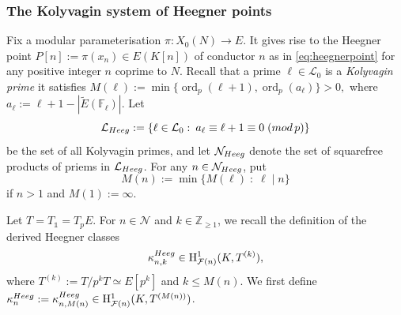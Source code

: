 \documentclass[10pt,reqno]{amsart}
\numberwithin{equation}{section}
\theoremstyle{plain}
\theoremstyle{definition}
\theoremstyle{definition}
\theoremstyle{plain}
\theoremstyle{plain}
\newtheorem{lemma}[thm]{Lemma}
\theoremstyle{plain}
\theoremstyle{plain}
\theoremstyle{plain}
\theoremstyle{plain}
\DeclareMathOperator{\ord}{ord}
\newcommand{\Z}{\mathbb{Z}}
\newcommand{\Fcal}{\mathcal{F}}
\newcommand{\cL}{\mathcal{L}}
\newcommand{\cN}{\mathcal{N}}
\newcommand{\rH}{\mathrm{H}}
\begin{document}
\subsubsection{The Kolyvagin system of Heegner points}\label{subsubsec:HPKS}
Fix a modular parameterisation 
$
\pi:X_0(N)\rightarrow E.
$
It gives rise to the Heegner point  
$
P[n]:=\pi(x_n)\in E(K[n]) 
$ of conductor $n$ as in \eqref{eq:heegnerpoint} for any positive integer $n$ coprime to $N$. Recall that a prime $\ell\in\mathcal{L}_0$ is a \emph{Kolyvagin prime} it satisfies
$
M(\ell):=\min \{\ord_p(\ell+1), \ord_p(a_\ell)\}>0,
$
where $a_\ell:=\ell+1-|\tilde{E}(\mathbb{F}_\ell)|$.
Let
\[
\mathcal{L}_{\rm Heeg}:=\{\ell\in\mathcal{L}_0\,\colon\, a_\ell\equiv\ell+1\equiv 0\;({\rm mod}\,p)\}
\]
be the set of all Kolyvagin primes, and let $\mathcal{N}_{\rm Heeg}$ denote the set of squarefree products of priems in $\cL_{\rm Heeg}$. For any $n\in \mathcal{N}_{\rm Heeg}$, put 
\begin{equation}\label{eq:M(n)}
 M(n):=\min \{M(\ell)\;\colon\;\ell\mid n\}
\end{equation}
if $n>1$ and $M(1):=\infty$. 

Let $T=T_\mathds{1}=T_pE$. 
For $n\in \mathcal{N}$ and $k\in \Z_{\geq 1}$, we recall the definition of the derived Heegner classes 
\begin{equation}\label{eq:der-Heeg-k}
\kappa_{n,k}^{\rm Heeg}\in \rH^1_{\Fcal(n)}(K,T^{(k)}),
\end{equation}
where $T^{(k)}:=T/p^kT\simeq E[p^k]$ and $k\leq M(n)$.
%
%
We first define $\kappa_{n}^{\rm Heeg}:=\kappa_{n,M(n)}^{\rm Heeg}\in\rH^1_{\Fcal(n)}(K,T^{(M(n))})$. 
\end{document}
